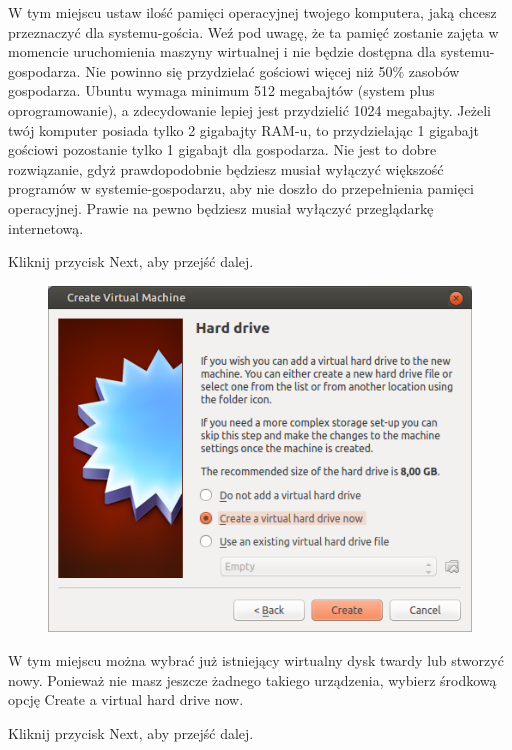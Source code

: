 W tym miejscu ustaw ilość pamięci operacyjnej twojego komputera, jaką chcesz przeznaczyć dla systemu-gościa. Weź pod uwagę, że ta pamięć zostanie zajęta w momencie uruchomienia maszyny wirtualnej i nie będzie dostępna dla systemu-gospodarza. Nie powinno się przydzielać gościowi więcej niż 50\% zasobów gospodarza. Ubuntu wymaga minimum 512 megabajtów (system plus oprogramowanie), a zdecydowanie lepiej jest przydzielić 1024 megabajty.
Jeżeli twój komputer posiada tylko 2 gigabajty RAM-u, to przydzielając 1 gigabajt gościowi pozostanie tylko 1 gigabajt dla gospodarza. Nie jest to dobre rozwiązanie, gdyż prawdopodobnie będziesz musiał wyłączyć większość programów w systemie-gospodarzu, aby nie doszło do przepełnienia pamięci operacyjnej. Prawie na pewno będziesz musiał wyłączyć przeglądarkę internetową.
\begin{flushright}
Kliknij przycisk \textcolor{ubuntu_orange}{Next}, aby przejść dalej.
\end{flushright}

\begin{figure}
	\vspace{-10pt}
	\includegraphics[width=\linewidth]{images/virtualbox_wizard3.png}
\end{figure}

W tym miejscu można wybrać już istniejący wirtualny dysk twardy lub stworzyć nowy. Ponieważ nie masz jeszcze żadnego takiego urządzenia, wybierz środkową opcję \textcolor{ubuntu_orange}{Create a virtual hard drive now}.
\begin{flushright}
Kliknij przycisk \textcolor{ubuntu_orange}{Next}, aby przejść dalej.
\end{flushright}
\clearpage

